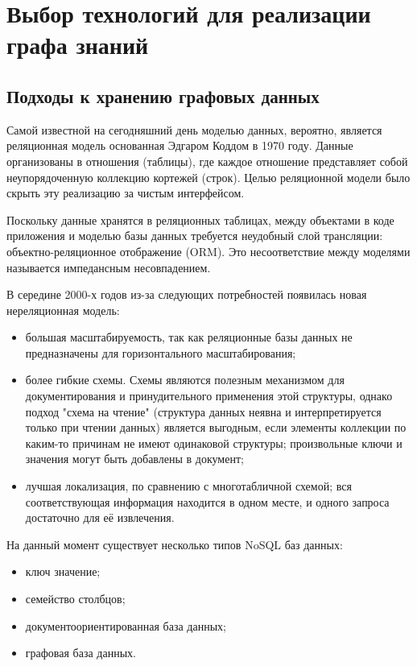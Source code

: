 \chapter{Выбор технологий для реализации графа знаний} \label{ch2}


\section{Подходы к хранению графовых данных}

Самой известной на сегодняшний день моделью данных, вероятно, является реляционная модель основанная Эдгаром Коддом в 1970 году. Данные организованы в отношения (таблицы), где каждое отношение представляет собой неупорядоченную коллекцию кортежей (строк). Целью реляционной модели было скрыть эту реализацию за чистым интерфейсом.

Поскольку данные хранятся в реляционных таблицах, между объектами в коде приложения и моделью базы данных требуется неудобный слой трансляции: объектно-реляционное отображение (ORM). Это несоответствие между моделями называется импедансным несовпадением.

В середине 2000-х годов из-за следующих потребностей появилась новая нереляционная модель:

\begin{itemize}
    \item большая масштабируемость, так как реляционные базы данных не предназначены для горизонтального масштабирования;
    \item более гибкие схемы. Схемы являются полезным механизмом для документирования и принудительного применения этой структуры, однако подход "схема на чтение" (структура данных неявна и интерпретируется только при чтении данных) является выгодным, если элементы коллекции по каким-то причинам не имеют одинаковой структуры; произвольные ключи и значения могут быть добавлены в документ;
    \item лучшая локализация, по сравнению с многотабличной схемой; вся соответствующая информация находится в одном месте, и одного запроса достаточно для её извлечения.
\end{itemize}

На данный момент существует несколько типов NoSQL баз данных:

\begin{itemize}
    \item ключ значение;
    \item семейство столбцов;
    \item документоориентированная база данных;
    \item графовая база данных.
\end{itemize}

